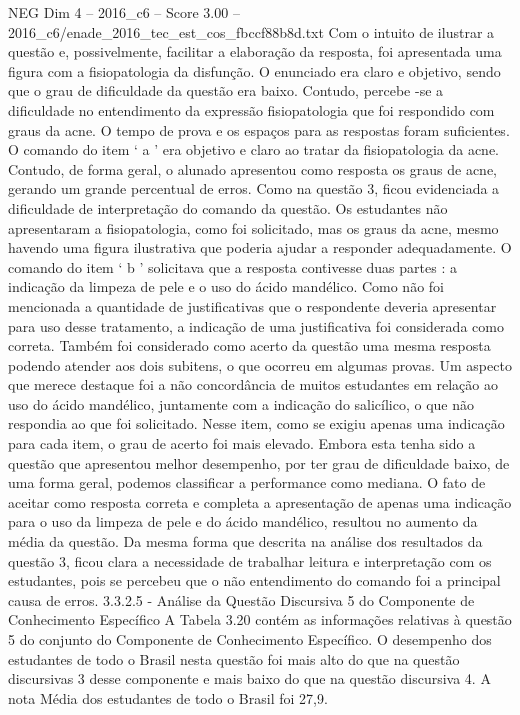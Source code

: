\begin{textsample}{NEG Dim 4 – 2016\_c6 – Score 3.00 – 2016\_c6/enade\_2016\_tec\_est\_cos\_fbccf88b8d.txt}
Com o intuito de ilustrar a questão e, possivelmente, facilitar a elaboração da resposta, foi apresentada uma figura com a fisiopatologia da disfunção.
O enunciado era claro e objetivo, sendo que o grau de dificuldade da questão era baixo.
Contudo, percebe -se a dificuldade no entendimento da expressão fisiopatologia que foi respondido com graus da acne.
O tempo de prova e os espaços para as respostas foram suficientes.
O comando do item ‘ a ’ era objetivo e claro ao tratar da fisiopatologia da acne.
Contudo, de forma geral, o alunado apresentou como resposta os graus de acne, gerando um grande percentual de erros.
Como na questão 3, ficou evidenciada a dificuldade de interpretação do comando da questão.
Os estudantes não apresentaram a fisiopatologia, como foi solicitado, mas os graus da acne, mesmo havendo uma figura ilustrativa que poderia ajudar a responder adequadamente.
O comando do item ‘ b ’ solicitava que a resposta contivesse duas partes : a indicação da limpeza de pele e o uso do ácido mandélico.
Como não foi mencionada a quantidade de justificativas que o respondente deveria apresentar para uso desse tratamento, a indicação de uma justificativa foi considerada como correta.
Também foi considerado como acerto da questão uma mesma resposta podendo atender aos dois subitens, o que ocorreu em algumas provas.
Um aspecto que merece destaque foi a não concordância de muitos estudantes em relação ao uso do ácido mandélico, juntamente com a indicação do salicílico, o que não respondia ao que foi solicitado.
Nesse item, como se exigiu apenas uma indicação para cada item, o grau de acerto foi mais elevado.
Embora esta tenha sido a questão que apresentou melhor desempenho, por ter grau de dificuldade baixo, de uma forma geral, podemos classificar a performance como mediana.
O fato de aceitar como resposta correta e completa a apresentação de apenas uma indicação para o uso da limpeza de pele e do ácido mandélico, resultou no aumento da média da questão.
Da mesma forma que descrita na análise dos resultados da questão 3, ficou clara a necessidade de trabalhar leitura e interpretação com os estudantes, pois se percebeu que o não entendimento do comando foi a principal causa de erros. 3.3.2.5 - Análise da Questão Discursiva 5 do Componente de Conhecimento Específico A Tabela 3.20 contém as informações relativas à questão 5 do conjunto do Componente de Conhecimento Específico.
O desempenho dos estudantes de todo o Brasil nesta questão foi mais alto do que na questão discursivas 3 desse componente e mais baixo do que na questão discursiva 4.
A nota Média dos estudantes de todo o Brasil foi 27,9.

\end{textsample}
